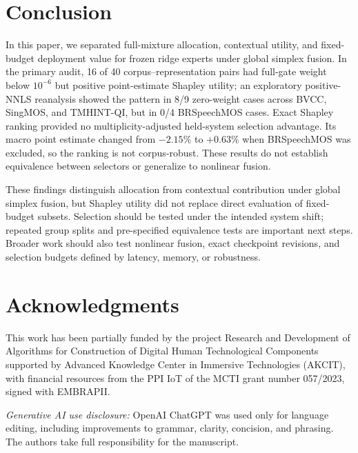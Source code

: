 \documentclass{article}
\begin{document}
\section{Conclusion}
\label{sec:conclusion}

In this paper, we separated full-mixture allocation, contextual utility, and
fixed-budget deployment value for frozen ridge experts under global simplex
fusion. In the primary audit, 16 of 40 corpus--representation pairs had
full-gate weight below $10^{-6}$ but positive point-estimate Shapley utility;
an exploratory positive-NNLS reanalysis showed the pattern in 8/9 zero-weight
cases across BVCC, SingMOS, and TMHINT-QI, but in 0/4 BRSpeechMOS cases. Exact
Shapley ranking provided no multiplicity-adjusted held-system selection
advantage. Its macro point estimate changed from $-2.15\%$ to $+0.63\%$ when
BRSpeechMOS was excluded, so the ranking is not corpus-robust. These results do
not establish equivalence between selectors or generalize to nonlinear fusion.

These findings distinguish allocation from contextual contribution under
global simplex fusion, but Shapley utility did not replace direct evaluation
of fixed-budget subsets. Selection should be tested under the intended system
shift; repeated group splits and pre-specified equivalence tests are important
next steps. Broader work should also test nonlinear fusion, exact checkpoint
revisions, and selection budgets defined by latency, memory, or robustness.
\section{Acknowledgments}

This work has been partially funded by the project Research and
Development of Algorithms for Construction of Digital Human Technological
Components supported by Advanced Knowledge Center in Immersive Technologies
(AKCIT), with financial resources from the PPI IoT of the MCTI grant number
057/2023, signed with EMBRAPII.

\textit{Generative AI use disclosure:} OpenAI ChatGPT was used only for
language editing, including improvements to grammar, clarity, concision, and
phrasing. The authors take full responsibility for the manuscript.





\end{document}
